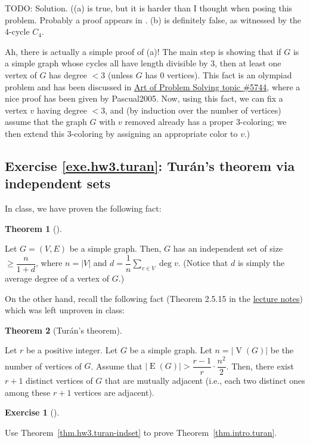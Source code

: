 \documentclass[numbers=enddot,12pt,final,onecolumn,notitlepage]{scrartcl}%
\newcounter{exer}
\theoremstyle{definition}
\newtheorem{theo}{Theorem}[section]
\newenvironment{theorem}[1][]
{\begin{theo}[#1]\begin{leftbar}}
{\end{leftbar}\end{theo}}
\newtheorem{exmp}[exer]{Exercise}
\newenvironment{exercise}[1][]
{\begin{exmp}[#1]\begin{leftbar}}
{\end{leftbar}\end{exmp}}
\let\sumnonlimits\sum
\renewcommand{\sum}{\sumnonlimits\limits}
\newcommand{\abs}[1]{\left| #1 \right|}
\newcommand{\tup}[1]{\left( #1 \right)}
\newcommand{\verts}[1]{\operatorname{V}\left( #1 \right)}
\newcommand{\edges}[1]{\operatorname{E}\left( #1 \right)}
\begin{document}
TODO: Solution. ((a) is true, but it is harder than I thought
when posing this problem. Probably a proof appears in
\cite{AGJJ09}. (b) is definitely false,
as witnessed by the $4$-cycle $C_4$.

Ah, there is actually a simple proof of (a)! The main step is
showing that if $G$ is a simple graph whose cycles all have length
divisible by $3$, then at least one vertex of $G$ has degree $< 3$
(unless $G$ has $0$ vertices).
This fact is an olympiad problem and has been discussed in
\href{https://artofproblemsolving.com/community/c6h5744}{Art of Problem Solving topic \#5744},
where a nice proof has been given by Pascual2005.
Now, using this fact, we can fix a vertex $v$ having degree $< 3$,
and (by induction over the number of vertices) assume that the
graph $G$ with $v$ removed already has a proper $3$-coloring;
we then extend this $3$-coloring by assigning an appropriate
color to $v$.)

\subsection{Exercise \ref{exe.hw3.turan}: Tur\'an's theorem via
independent sets}

In class, we have proven the following fact:

\begin{theorem} \label{thm.hw3.turan-indset}
Let $G = \tup{V, E}$ be a simple graph.
Then, $G$ has an independent set of size
$\geq \dfrac{n}{1+d}$, where $n = \abs{V}$ and
$d = \dfrac{1}{n} \sum_{v \in V} \deg v$.
(Notice that $d$ is simply the average degree of a vertex of $G$.)
\end{theorem}

On the other hand, recall the following fact
(Theorem 2.5.15 in the
\href{http://www.cip.ifi.lmu.de/~grinberg/t/17s/nogra.pdf}{lecture notes})
which was left unproven in class:

\begin{theorem}[Tur\'an's theorem] \label{thm.intro.turan}
Let $r$ be a positive integer.
Let $G$ be a simple graph. Let $n = \abs{\verts{G}}$ be the number of
vertices of $G$. Assume that
$\abs{\edges{G}} > \dfrac{r-1}{r} \cdot \dfrac{n^2}{2}$. Then, there
exist $r + 1$ distinct vertices
of $G$ that are mutually adjacent (i.e., each two distinct ones among
these $r + 1$ vertices are adjacent).
\end{theorem}

\begin{exercise} \label{exe.hw3.turan}
Use Theorem~\ref{thm.hw3.turan-indset} to prove
Theorem~\ref{thm.intro.turan}.
\end{exercise}
\end{document}
